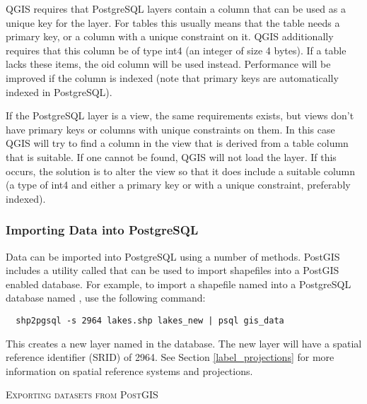 QGIS requires that PostgreSQL layers contain a column that can be
used as a unique key for the layer. For tables this usually means
that the table needs a primary key, or a column with a unique
constraint on it. QGIS additionally requires that this column be of
type int4 (an integer of size 4 bytes). If a table lacks these items,
the oid column will be used instead. Performance will be improved if the
column is indexed (note that primary keys are automatically indexed in
PostgreSQL). 

If the PostgreSQL layer is a view, the same requirements exists, but
views don't have primary keys or columns with unique constraints on
them. In this case QGIS will try to find a column in the view that is
derived from a table column that is suitable. If one cannot be found,
QGIS will not load the layer. If this occurs, the solution is to alter
the view so that it does include a suitable column (a type of int4
and either a primary key or with a unique constraint, preferably indexed).

\subsubsection{Importing Data into PostgreSQL}\label{sec:loading_postgis_data}

Data can be imported into PostgreSQL using a number of methods. PostGIS
includes a utility called  that can be used to import shapefiles into
a PostGIS enabled database. For example, to import a shapefile named
into a PostgreSQL database named , use the following command:

\begin{verbatim} 
  shp2pgsql -s 2964 lakes.shp lakes_new | psql gis_data
\end{verbatim}

This creates a new layer named  in the
 database. The
new layer will have a spatial reference identifier (SRID) of 2964. See Section 
\ref{label_projections} for more information on spatial reference systems and
projections.
\begin{Tip}
\caption{\textsc{Exporting datasets from PostGIS}}
\end{Tip}

